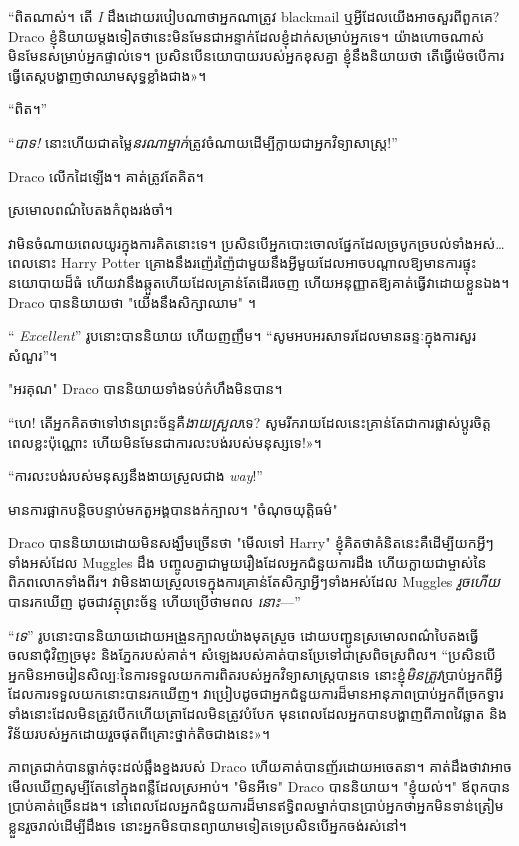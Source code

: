 {{{“ពិតណាស់។ តើ \emph{I} ដឹងដោយរបៀបណាថាអ្នកណាត្រូវ blackmail ឬអ្វីដែលយើងអាចសួរពីពួកគេ? Draco ខ្ញុំនិយាយម្តងទៀតថានេះមិនមែនជាអន្ទាក់ដែលខ្ញុំដាក់សម្រាប់អ្នកទេ។ យ៉ាងហោចណាស់មិនមែនសម្រាប់អ្នកផ្ទាល់ទេ។ ប្រសិន​បើ​នយោបាយ​របស់​អ្នក​ខុស​គ្នា ខ្ញុំ​នឹង​និយាយ​ថា តើ​ធ្វើ​ម៉េច​បើ​ការ​ធ្វើ​តេស្ត​បង្ហាញ​ថា​ឈាម​សុទ្ធ​ខ្លាំង​ជាង»។

“ពិត។”

“\emph{បាទ!} នោះហើយជាតម្លៃ\emph{នរណាម្នាក់}ត្រូវចំណាយដើម្បីក្លាយជាអ្នកវិទ្យាសាស្ត្រ!”

Draco លើកដៃឡើង។ គាត់ត្រូវតែគិត។

ស្រមោលពណ៌បៃតងកំពុងរង់ចាំ។

វាមិនចំណាយពេលយូរក្នុងការគិតនោះទេ។ ប្រសិនបើអ្នកបោះចោលផ្នែកដែលច្របូកច្របល់ទាំងអស់… ពេលនោះ Harry Potter គ្រោងនឹងរញ៉េរញ៉ៃជាមួយនឹងអ្វីមួយដែលអាចបណ្តាលឱ្យមានការផ្ទុះនយោបាយដ៏ធំ ហើយវានឹងឆ្កួតហើយដែលគ្រាន់តែដើរចេញ ហើយអនុញ្ញាតឱ្យគាត់ធ្វើវាដោយខ្លួនឯង។ Draco បាននិយាយថា "យើងនឹងសិក្សាឈាម" ។

“\emph{ Excellent}” រូបនោះបាននិយាយ ហើយញញឹម។ “សូម​អបអរសាទរ​ដែល​មាន​ឆន្ទៈ​ក្នុង​ការ​សួរ​សំណួរ”។

"អរគុណ" Draco បាននិយាយទាំងទប់កំហឹងមិនបាន។

“ហេ! តើអ្នកគិតថាទៅឋានព្រះច័ន្ទគឺ\emph{ងាយស្រួល}ទេ? សូម​រីករាយ​ដែល​នេះ​គ្រាន់​តែ​ជា​ការ​ផ្លាស់​ប្តូរ​ចិត្ត​ពេល​ខ្លះ​ប៉ុណ្ណោះ ហើយ​មិន​មែន​ជា​ការ​លះបង់​របស់​មនុស្ស​ទេ!»។

“ការលះបង់របស់មនុស្សនឹងងាយស្រួលជាង \emph{way}!”

មាន​ការ​ផ្អាក​បន្តិច​បន្ទាប់​មក​តួ​អង្គ​បាន​ងក់​ក្បាល។ "ចំណុចយុត្តិធម៌"

Draco បាននិយាយដោយមិនសង្ឃឹមច្រើនថា "មើលទៅ Harry" ខ្ញុំគិតថាគំនិតនេះគឺដើម្បីយកអ្វីៗទាំងអស់ដែល Muggles ដឹង បញ្ចូលគ្នាជាមួយរឿងដែលអ្នកជំនួយការដឹង ហើយក្លាយជាម្ចាស់នៃពិភពលោកទាំងពីរ។ វាមិនងាយស្រួលទេក្នុងការគ្រាន់តែសិក្សាអ្វីៗទាំងអស់ដែល Muggles \emph{រួចហើយ} បានរកឃើញ ដូចជាវត្ថុព្រះច័ន្ទ ហើយប្រើថាមពល \emph{នោះ}—”

“\emph{ទេ}” រូបនោះបាននិយាយដោយអង្រួនក្បាលយ៉ាងមុតស្រួច ដោយបញ្ជូនស្រមោលពណ៌បៃតងធ្វើចលនាជុំវិញច្រមុះ និងភ្នែករបស់គាត់។ សំឡេង​របស់​គាត់​បាន​ប្រែ​ទៅ​ជា​ស្រពិចស្រពិល។ “ប្រសិនបើអ្នកមិនអាចរៀនសិល្បៈនៃការទទួលយកការពិតរបស់អ្នកវិទ្យាសាស្ត្របានទេ នោះខ្ញុំ\emph{មិនត្រូវ}ប្រាប់អ្នកពីអ្វីដែលការទទួលយកនោះបានរកឃើញ។ វាប្រៀបដូចជាអ្នកជំនួយការដ៏មានអានុភាពប្រាប់អ្នកពីច្រកទ្វារទាំងនោះដែលមិនត្រូវបើក ​​ហើយត្រាដែលមិនត្រូវបំបែក មុនពេលដែលអ្នកបានបង្ហាញពីភាពវៃឆ្លាត និងវិន័យរបស់អ្នកដោយរួចផុតពីគ្រោះថ្នាក់តិចជាងនេះ»។

ភាពត្រជាក់បានធ្លាក់ចុះដល់ឆ្អឹងខ្នងរបស់ Draco ហើយគាត់បានញ័រដោយអចេតនា។ គាត់ដឹងថាវាអាចមើលឃើញសូម្បីតែនៅក្នុងពន្លឺដែលស្រអាប់។ "មិនអីទេ" Draco បាននិយាយ។ "ខ្ញុំយល់។" ឪពុកបានប្រាប់គាត់ច្រើនដង។ នៅពេលដែលអ្នកជំនួយការដ៏មានឥទ្ធិពលម្នាក់បានប្រាប់អ្នកថាអ្នកមិនទាន់ត្រៀមខ្លួនរួចរាល់ដើម្បីដឹងទេ នោះអ្នកមិនបានព្យាយាមទៀតទេប្រសិនបើអ្នកចង់រស់នៅ។

}}}
